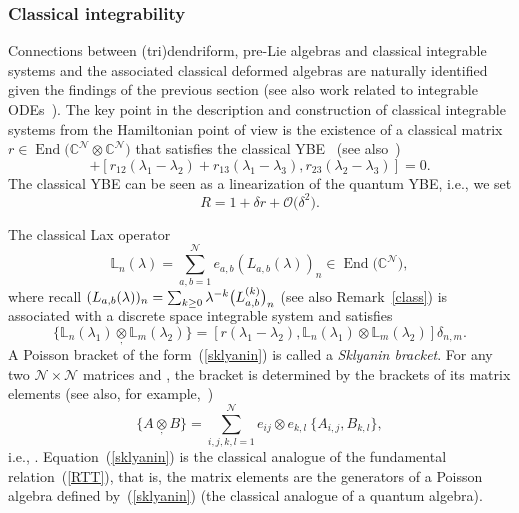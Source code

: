 \documentclass[pdftex]{sigma}
\numberwithin{equation}{section}
\theoremstyle{definition}
\DeclareMathOperator{\EEnd}{End}%
\begin{document}
\subsubsection*{Classical integrability}
Connections between (tri)dendriform, pre-Lie algebras and classical integrable systems and the associated
classical deformed algebras are naturally identified given the findings of the previous section (see also work related to integrable ODEs~\cite{Gol}).
The key point in the description and construction of classical integrable systems from the Hamiltonian point of view is the existence of a classical matrix $r \in \EEnd\bigl({\mathbb C}^{\mathcal N} \otimes {\mathbb C}^{\mathcal N}\bigr)$ that satisfies the classical YBE~\cite{FT, TST} (see also~\cite{RotYB})
\begin{equation*}
[r_{12}(\lambda_1-\lambda_2), r_{13}(\lambda_1-\lambda_3)] + [r_{12}(\lambda_1-\lambda_2)+r_{13}(\lambda_1-\lambda_3), r_{23}(\lambda_2-\lambda_3)] =0.
\end{equation*}
The classical YBE can be seen as a linearization of the quantum YBE, i.e., we set
\[
R= 1 + \delta r + {\mathcal O}\bigl(\delta^2\bigr).
\]

The classical Lax operator
\[
{\mathbb L}_n(\lambda) = \sum_{a,b =1}^{\mathcal N} e_{a,b} (L_{a,b}(\lambda))_n\in \EEnd\bigl({\mathbb C}^{\mathcal N}\bigr),
\]
 where recall $(L_{a,b}(\lambda))_n = \smash{\sum_{k \geq 0} \lambda^{-k}\bigl(L^{(k)}_{a,b}\bigr)_n}$ (see also Remark~\ref{class}) is associated with a discrete space integrable system and satisfies~\cite{FT, Skl1, Skl2}
\begin{equation}
\{ {\mathbb L}_n(\lambda_1) \underset{,}{\otimes} {\mathbb L}_m(\lambda_2)\} = [r(\lambda_1-\lambda_2), { \mathbb L}_n(\lambda_1)\otimes {\mathbb L}_m(\lambda_2)]\delta_{n,m}. \label{sklyanin}
\end{equation}
A Poisson bracket of the form~(\ref{sklyanin}) is called a {\it Sklyanin bracket}. For any two ${\mathcal N}\times {\mathcal N}$ matrices  and , the bracket  is determined by the brackets of its matrix elements (see also, for example,~\cite{Chari, FT})
\begin{equation}
\{A \underset{,}{\otimes} B\} = \sum_{i,j, k,l=1}^{\mathcal N} e_{ij}\otimes e_{k,l}\ \{A_{i,j}, B_{k,l}\}, \nonumber
\end{equation}
i.e., .
Equation~(\ref{sklyanin}) is the classical analogue of the fundamental relation~(\ref{RTT}),
that is, the matrix elements  are the generators of a Poisson algebra defined
by~(\ref{sklyanin}) (the classical analogue of a quantum algebra).
\end{document}
